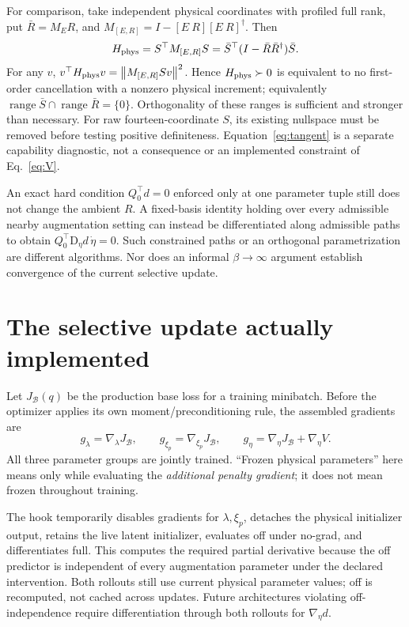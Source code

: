 \documentclass[11pt,a4paper]{article}
\newcommand{\D}{\mathrm D}
\newcommand{\ran}{\operatorname{range}}
\newcommand{\norm}[1]{\left\lVert#1\right\rVert}
\theoremstyle{remark}
\begin{document}
For comparison, take independent physical coordinates with profiled full rank, put $\bar R=M_E R$, and $M_{[E,R]}=I-[E\ R][E\ R]^\dagger$. Then
\begin{equation}\label{eq:tangent}
 H_{\rm phys}=S^\top M_{[E,R]}S
 =\bar S^\top(I-\bar R\bar R^\dagger)\bar S.
\end{equation}
For any $v$, $v^\top H_{\rm phys}v=\norm{M_{[E,R]}Sv}^2$. Hence $H_{\rm phys}\succ0$ is equivalent to no first-order cancellation with a nonzero physical increment; equivalently $\ran\bar S\cap\ran\bar R=\{0\}$. Orthogonality of these ranges is sufficient and stronger than necessary. For raw fourteen-coordinate $S$, its existing nullspace must be removed before testing positive definiteness. Equation~\eqref{eq:tangent} is a separate capability diagnostic, not a consequence or an implemented constraint of Eq.~\eqref{eq:V}.

An exact hard condition $Q_0^\top d=0$ enforced only at one parameter tuple still does not change the ambient $R$. A fixed-basis identity holding over every admissible nearby augmentation setting can instead be differentiated along admissible paths to obtain $Q_0^\top\D_\eta d\,\dot\eta=0$. Such constrained paths or an orthogonal parametrization are different algorithms. Nor does an informal $\beta\to\infty$ argument establish convergence of the current selective update.

\section{The selective update actually implemented}\label{sec:update}
Let $J_{\mathcal B}(q)$ be the production base loss for a training minibatch. Before the optimizer applies its own moment/preconditioning rule, the assembled gradients are
\begin{equation}\label{eq:routed}
 g_\lambda=\nabla_\lambda J_\mathcal B,\qquad
 g_{\xi_p}=\nabla_{\xi_p}J_\mathcal B,\qquad
 g_\eta=\nabla_\eta J_\mathcal B+\nabla_\eta V.
\end{equation}
All three parameter groups are jointly trained. ``Frozen physical parameters'' here means only while evaluating the \emph{additional penalty gradient}; it does not mean frozen throughout training.

The hook temporarily disables gradients for $\lambda,\xi_p$, detaches the physical initializer output, retains the live latent initializer, evaluates off under no-grad, and differentiates full. This computes the required partial derivative because the off predictor is independent of every augmentation parameter under the declared intervention. Both rollouts still use current physical parameter values; off is recomputed, not cached across updates. Future architectures violating off-independence require differentiation through both rollouts for $\nabla_\eta d$.
\end{document}
